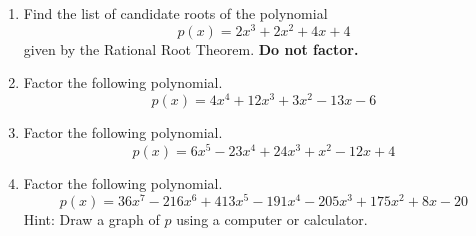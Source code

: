 \documentclass{article}
\begin{document}
\ActivityTitle[class={College Algebra}, number={4}, name={Polynomials 2}]

\begin{enumerate}
\item Find the list of candidate roots of the polynomial \[ p(x) = 2x^3 + 2x^2 + 4x + 4 \] given by the Rational Root Theorem. \textbf{Do not factor.}

   \vspace{3cm}

\item Factor the following polynomial. \[ p(x) = 4x^4 + 12x^3 + 3x^2 - 13x - 6 \]

   \vspace{7cm}

\newpage

\item Factor the following polynomial. \[ p(x) = 6x^5 - 23x^4 + 24x^3 + x^2 - 12x + 4 \]

   \vspace{7cm}

\newpage

\item Factor the following polynomial. \[ p(x) = 36x^7 - 216x^6 + 413x^5 - 191x^4 - 205x^3 + 175x^2 + 8x - 20 \] Hint: Draw a graph of $p$ using a computer or calculator.

   \vspace{7cm}
\end{enumerate}
\end{document}
